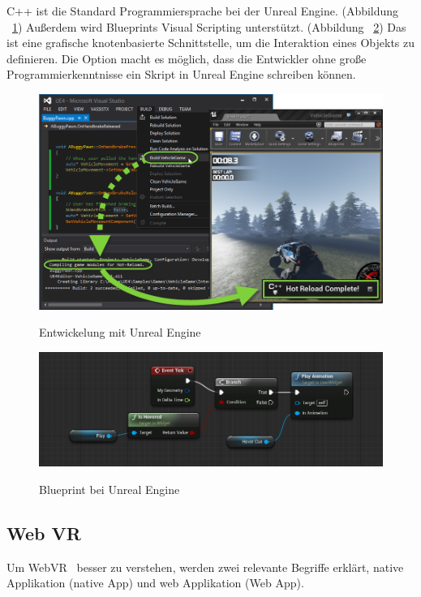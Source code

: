   C++ ist die Standard Programmiersprache bei der Unreal Engine. (Abbildung ~\ref{fig:uec}) Außerdem wird Blueprints Visual Scripting unterstützt. (Abbildung ~\ref{fig:ueblueprint}) Das ist eine grafische knotenbasierte Schnittstelle, um die Interaktion eines Objekts zu definieren. Die Option macht es möglich, dass die Entwickler ohne große Programmierkenntnisse ein Skript in Unreal Engine schreiben können.

\begin{figure}[ht]
\vspace*{1em}
\centering
\caption{Entwickelung mit Unreal Engine}
\includegraphics[width=\textwidth]{images/uec.png}
\label{fig:uec} 
\end{figure} 
  
\begin{figure}[ht]
\vspace*{1em}
\centering
\caption{Blueprint bei Unreal Engine}
\includegraphics[width=\textwidth]{images/ueblueprint.png}
\label{fig:ueblueprint} 
\end{figure}
  
 \subsection{Web VR}
 Um \glqq WebVR \grqq\ besser zu verstehen, werden zwei relevante Begriffe erklärt, native Applikation (native App) und web Applikation (Web App).
 
